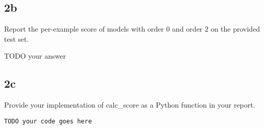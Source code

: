 \documentclass[10pt]{article}
\newcommand{\officialdirections}[1]{{\color{purple} #1}}
\begin{document}
\subsection{2b}
\officialdirections{
    Report the per-example score of models with order 0 and order 2 on the provided test set.}

TODO your answer

\newpage

\subsection{2c}
\officialdirections{
    Provide your implementation of calc\_score as a Python function in your report.}

\begin{verbatim}
TODO your code goes here
\end{verbatim}
\end{document}
